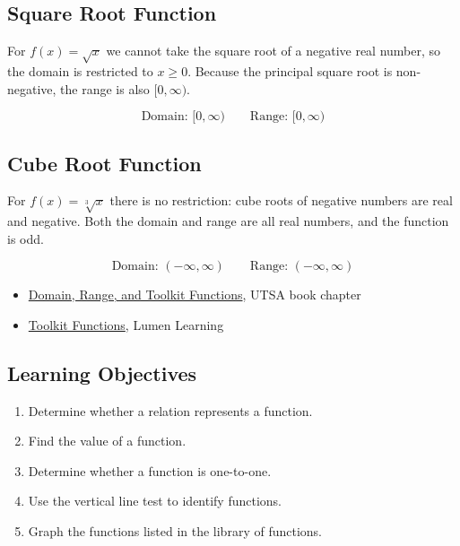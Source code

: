\subsection*{Square Root Function}

For $f(x) = \sqrt{x}$ we cannot take the square root of a negative real
number, so the domain is restricted to $x \geq 0$.  Because the principal
square root is non-negative, the range is also $[0, \infty)$.

\[
  \text{Domain: }[0, \infty) \qquad \text{Range: }[0, \infty)
\]

\subsection*{Cube Root Function}

For $f(x) = \sqrt[3]{x}$ there is no restriction: cube roots of negative
numbers are real and negative.  Both the domain and range are all real
numbers, and the function is odd.

\[
  \text{Domain: }(-\infty, \infty) \qquad \text{Range: }(-\infty, \infty)
\]

\begin{itemize}
  \item \href{https://mathresearch.utsa.edu/wikiFiles/MAT1053/Domain_Range_and_Toolkit_Functions/MAT1053_M1.2Domain_Range_and_Toolkit_Functions.pdf}{Domain, Range, and Toolkit Functions}, UTSA book chapter
  \item \href{https://courses.lumenlearning.com/cuny-hunter-collegealgebra/chapter/toolkit-functions/}{Toolkit Functions}, Lumen Learning
\end{itemize}

\subsection{Learning Objectives}
\label{ssec:lear-fe6e}

\begin{enumerate}
    \item Determine whether a relation represents a function.
    \item Find the value of a function.
    \item Determine whether a function is one-to-one.
    \item Use the vertical line test to identify functions.
    \item Graph the functions listed in the library of functions.
\end{enumerate}

